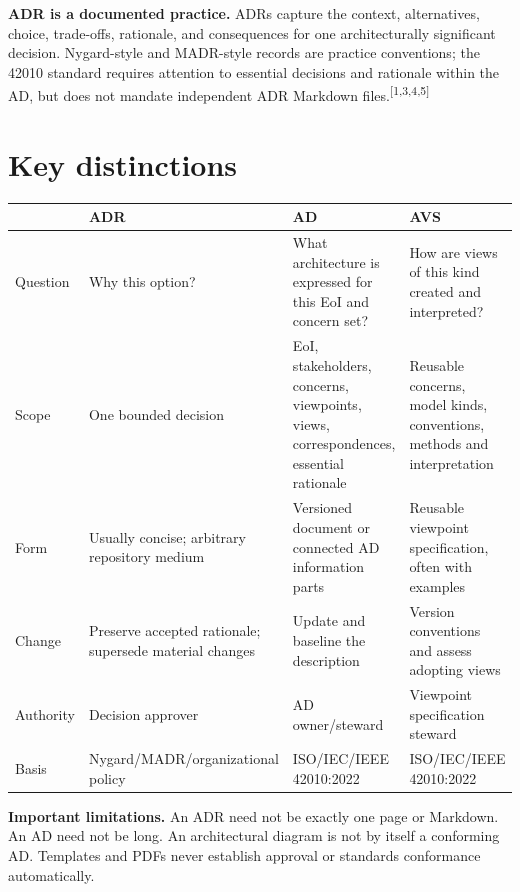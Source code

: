 \documentclass[10pt,letterpaper]{article}
\begin{document}
\textbf{ADR is a documented practice.} ADRs capture the context,
alternatives, choice, trade-offs, rationale, and consequences for one
architecturally significant decision. Nygard-style and MADR-style records
are practice conventions; the 42010 standard requires attention to
essential decisions and rationale within the AD, but does not mandate
independent ADR Markdown files.\textsuperscript{[1,3,4,5]}

\section{Key distinctions}
\small
\begin{tabularx}{\linewidth}{@{}L{.87in}Y Y Y@{}}
\toprule
& \textbf{ADR} & \textbf{AD} & \textbf{AVS}\\
\midrule
Question & Why this option? & What architecture is expressed
for this EoI and concern set? & How are views of this kind
created and interpreted?\\
Scope & One bounded decision & EoI, stakeholders, concerns,
viewpoints, views, correspondences, essential rationale &
Reusable concerns, model kinds, conventions, methods and interpretation\\
Form & Usually concise; arbitrary repository medium &
Versioned document or connected AD information parts &
Reusable viewpoint specification, often with examples\\
Change & Preserve accepted rationale; supersede material changes &
Update and baseline the description & Version conventions and
assess adopting views\\
Authority & Decision approver & AD owner/steward &
Viewpoint specification steward\\
Basis & Nygard/MADR/organizational policy &
ISO/IEC/IEEE 42010:2022 & ISO/IEC/IEEE 42010:2022\\
\bottomrule
\end{tabularx}
\normalsize
\begin{principle}
\textbf{Important limitations.} An ADR need not be exactly one page or
Markdown. An AD need not be long. An architectural diagram is not by itself
a conforming AD. Templates and PDFs never establish approval or
standards conformance automatically.
\end{principle}
\end{document}
